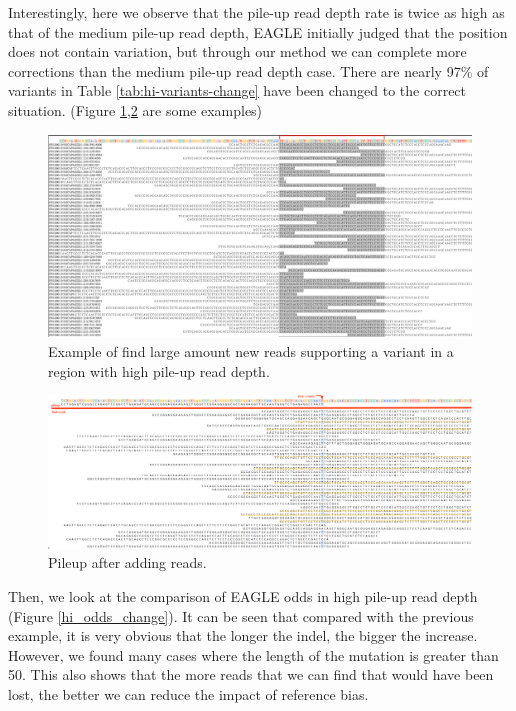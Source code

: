 Interestingly, here we observe that the pile-up read depth rate is twice as high as that of the medium pile-up read depth, EAGLE initially judged that the position does not contain variation, but through our method we can complete more corrections than the medium pile-up read depth case. There are nearly 97\% of variants in Table \ref{tab:hi-variants-change} have been changed to the correct situation. (Figure \ref{hi_new_REFread},\ref{hi_pileup_REFread} are some examples)

\begin{figure}[H]
\centering
\includegraphics[width=1\columnwidth]{body/image/hi_new_REFread.png}
\caption[New reads in a region with high pile-up read depth]{Example of find large amount new reads supporting a variant in a region with high pile-up read depth.}
\label{hi_new_REFread}
\end{figure}

\begin{figure}[H]
\centering
\includegraphics[width=1\columnwidth]{body/image/hi_pileup_REFread.png}
\caption[variant pileup in high pile-up read depth]{Pileup after adding reads.}
\label{hi_pileup_REFread}
\end{figure}

Then, we look at the comparison of EAGLE odds in high pile-up read depth (Figure \ref{hi_odds_change}). It can be seen that compared with the previous example, it is very obvious that the longer the indel, the bigger the increase. However, we found many cases where the length of the mutation is greater than 50. This also shows that the more reads that we can find that would have been lost, the better we can reduce the impact of reference bias.

